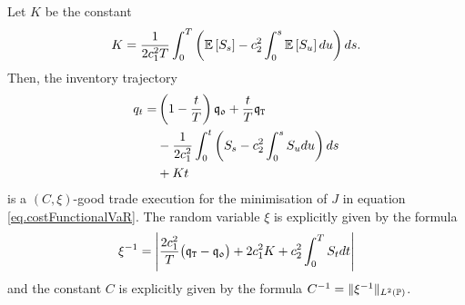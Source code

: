 \documentclass[10pt,a4paper]{article}
\begin{document}
\begin{prop}\label{prop.goodTradeExecutionVaR}
	Let $K$ be the constant 
	\begin{equation*}
	K=\frac{1}{2c_{1}^{2} T}\int_{0}^{T} 
	\left(
	\mathbb{{E}}\left[S_s\right] - c_{2}^{2} \int_{0}^{s}\mathbb{{E}}\left[S_u\right]du 
	 \right) ds.
	\end{equation*}
	Then, the inventory trajectory 
	\begin{equation}\label{eq.goodExecutionVaR}
	\begin{split}
	q_t =& \left(1-\frac{t}{T}\right)\mathfrak{q_0} + \frac{t}{T}\mathfrak{q}_{\mathtt{T} } \\
	& - \frac{1}{2c_{1}^{2}}\int_{0}^{t} 
	\left(
	S_s - c_{2}^{2} \int_{0}^{s}S_u du 
	\right) ds\\
	& +Kt
	\end{split}
	\end{equation}
	is a $(C,\xi)$-good trade execution for the minimisation of $J$ in equation \eqref{eq.costFunctionalVaR}. The random variable $\xi$ is explicitly given by the formula  
	\begin{equation*}
	\xi^{-1}  = \left\lvert
	\frac{2c_{1}^{2}}{T} \big(\mathfrak{q}_{\mathtt{T} } - \mathfrak{q_0} \big)
	+2c_{1}^{2} K 
	+c_{2}^{2} \int_{0}^{T} S_t dt 
	\right\rvert
	\end{equation*}
	and the constant $C$ is explicitly given by the formula $C^{-1}=\lVert \xi^{-1} \rVert_{L^{2}({\mathbb{P}})}$. 
\end{prop}
\end{document}
